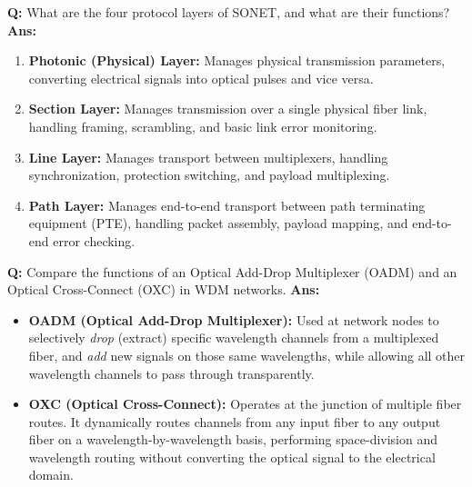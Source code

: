 \documentclass[10pt,a4paper,twocolumn]{article}
\begin{document}
\begin{tcolorbox}[
  colback=white,
  colframe=UnitColorFive,
  colbacktitle=gray!10!white,
  coltitle=black,
  fonttitle=\bfseries\sffamily\small,
  title={Unit V $\bullet$ Card 7: SONET Layers},
  boxrule=1.2pt,
  arc=2mm,
  outer arc=2mm,
  boxsep=1.5mm,
  top=1mm,
  bottom=1mm,
  left=1.5mm,
  right=1.5mm,
  before skip=2.5mm,
  after skip=2.5mm
]
\textbf{Q:} What are the four protocol layers of SONET, and what are their functions?
\tcbline
\textbf{Ans:} \begin{enumerate}
  \item \textbf{Photonic (Physical) Layer:} Manages physical transmission parameters, converting electrical signals into optical pulses and vice versa.
  \item \textbf{Section Layer:} Manages transmission over a single physical fiber link, handling framing, scrambling, and basic link error monitoring.
  \item \textbf{Line Layer:} Manages transport between multiplexers, handling synchronization, protection switching, and payload multiplexing.
  \item \textbf{Path Layer:} Manages end-to-end transport between path terminating equipment (PTE), handling packet assembly, payload mapping, and end-to-end error checking.
\end{enumerate}
\end{tcolorbox}


\begin{tcolorbox}[
  colback=white,
  colframe=UnitColorFive,
  colbacktitle=gray!10!white,
  coltitle=black,
  fonttitle=\bfseries\sffamily\small,
  title={Unit V $\bullet$ Card 8: OADM vs. OXC},
  boxrule=1.2pt,
  arc=2mm,
  outer arc=2mm,
  boxsep=1.5mm,
  top=1mm,
  bottom=1mm,
  left=1.5mm,
  right=1.5mm,
  before skip=2.5mm,
  after skip=2.5mm
]
\textbf{Q:} Compare the functions of an Optical Add-Drop Multiplexer (OADM) and an Optical Cross-Connect (OXC) in WDM networks.
\tcbline
\textbf{Ans:} \begin{itemize}
  \item   \textbf{OADM (Optical Add-Drop Multiplexer):} Used at network nodes to selectively \textit{drop} (extract) specific wavelength channels from a multiplexed fiber, and \textit{add} new signals on those same wavelengths, while allowing all other wavelength channels to pass through transparently.
  \item   \textbf{OXC (Optical Cross-Connect):} Operates at the junction of multiple fiber routes. It dynamically routes channels from any input fiber to any output fiber on a wavelength-by-wavelength basis, performing space-division and wavelength routing without converting the optical signal to the electrical domain.
\end{itemize}
\end{tcolorbox}
\end{document}
